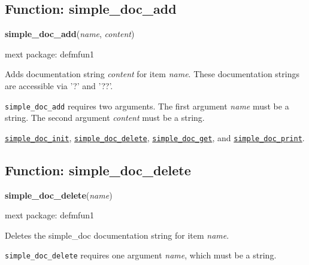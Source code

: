 \documentclass[]{article}
\begin{document}
\vspace{5 pt}


\subsection{Function: simple\_doc\_add\label{sec:simple_doc_add}}
\hypertarget{simple_doc_add}{}
{\bf simple\_doc\_add}({\it name}, {\it content})


\noindent mext package: defmfun1



\vspace{5 pt}
Adds documentation string {\it content} for item {\it name}. These documentation strings are accessible via '?' and '??'. 

\vspace{5 pt}

   {\tt simple\_doc\_add} requires two arguments.
    The first argument {\it name} must be a string.
    The second argument {\it content} must be a string.


\vspace{5 pt}


  \hyperlink{simple_doc_init}{{\tt simple\_doc\_init}}, \hyperlink{simple_doc_delete}{{\tt simple\_doc\_delete}}, \hyperlink{simple_doc_get}{{\tt simple\_doc\_get}}, and \hyperlink{simple_doc_print}{{\tt simple\_doc\_print}}.

\vspace{5 pt}


\subsection{Function: simple\_doc\_delete\label{sec:simple_doc_delete}}
\hypertarget{simple_doc_delete}{}
{\bf simple\_doc\_delete}({\it name})


\noindent mext package: defmfun1



\vspace{5 pt}
Deletes the simple\_doc documentation string for item {\it name}. 

\vspace{5 pt}

   {\tt simple\_doc\_delete} requires one argument {\it name}, which must be a string.


\vspace{5 pt}
\end{document}
